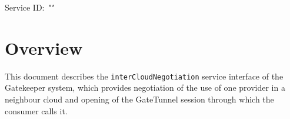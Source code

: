 \documentclass[a4paper]{arrowhead}
\begin{document}
\sloppy

\ArrowheadSetup

\begin{center}
  \vspace*{1cm}
  \huge{\arrowtitle}

  \vspace*{0.2cm}
  \LARGE{\arrowtype}
  \vspace*{1cm}

  \Large{Service ID: \textit{"\arrowid"}}

  \vspace*{\fill}


  \vspace*{1cm}
  \vspace*{\fill}

  \begin{abstract}
    This document describes the HTTP/1.1 protocol with TLS payload security and JSON payload encoding variant of the \texttt{inter\allowbreak{}Cloud\allowbreak{}Negotiation} service of the Gatekeeper system.
  \end{abstract}

  \vspace*{1cm}
\end{center}

\newpage

\tableofcontents
\newpage

\section{Overview}
\label{sec:overview}

This document describes the \texttt{inter\allowbreak{}Cloud\allowbreak{}Negotiation} service interface of the Gatekeeper system, which provides negotiation of the use of one provider in a neighbour cloud and opening of the GateTunnel session through which the consumer calls it.
\end{document}
